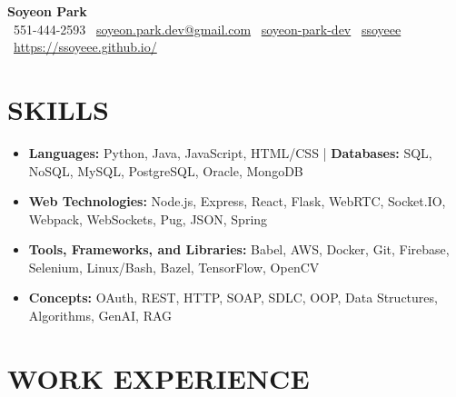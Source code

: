 \documentclass[a4paper,10.5pt]{article}
\begin{document}
\begin{center}
    {\Huge \textbf{Soyeon Park}}\\
    \faPhone\ 551-444-2593 \enspace \enspace \faEnvelope\ \href{mailto:soyeon.park.dev@gmail.com}{soyeon.park.dev@gmail.com} \enspace \enspace \faLinkedin\ \href{https://www.linkedin.com/in/soyeon-park-dev}{soyeon-park-dev}
    \enspace \enspace \faGithub\ \href{https://github.com/ssoyeee}{ssoyeee} \enspace \enspace \faGlobe\ \href{https://ssoyeee.github.io/}{https://ssoyeee.github.io/}
\end{center}

\vspace{-0em} %
\section*{SKILLS}
\vspace{-0.2em} %
\noindent
\begin{itemize}[label={}, leftmargin=*]
    \item \textbf{Languages:} Python, Java, JavaScript, HTML/CSS | \textbf{Databases:} SQL, NoSQL, MySQL, PostgreSQL, Oracle, MongoDB
    \item \textbf{Web Technologies:} Node.js, Express, React, Flask, WebRTC, Socket.IO, Webpack, WebSockets, Pug, JSON, Spring \item \textbf{Tools, Frameworks, and Libraries:} Babel, AWS, Docker, Git, Firebase, Selenium, Linux/Bash, Bazel, TensorFlow, OpenCV
    \item \textbf{Concepts:} OAuth, REST, HTTP, SOAP, SDLC, OOP, Data Structures, Algorithms, GenAI, RAG
\end{itemize}
\vspace{-0.1em} %
\section*{WORK EXPERIENCE}
\end{document}
